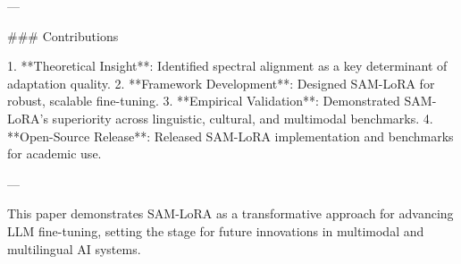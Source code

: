 ---

### Contributions  

1. **Theoretical Insight**: Identified spectral alignment as a key determinant of adaptation quality.  
2. **Framework Development**: Designed SAM-LoRA for robust, scalable fine-tuning.  
3. **Empirical Validation**: Demonstrated SAM-LoRA’s superiority across linguistic, cultural, and multimodal benchmarks.  
4. **Open-Source Release**: Released SAM-LoRA implementation and benchmarks for academic use.  

--- 

This paper demonstrates SAM-LoRA as a transformative approach for advancing LLM fine-tuning, setting the stage for future innovations in multimodal and multilingual AI systems.